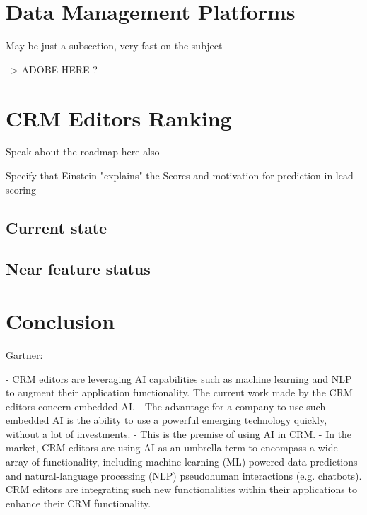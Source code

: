 \section{Data Management Platforms}
May be just a subsection, very fast on the subject

--> ADOBE HERE ?


\section{CRM Editors Ranking}
Speak about the roadmap here also

Specify that Einstein "explains" the Scores and motivation for prediction in lead scoring

\subsection{Current state}


\subsection{Near feature status}


\section{Conclusion}

Gartner:

    - CRM editors are leveraging AI capabilities such as machine learning and NLP to augment their application functionality. The current work made by the CRM editors concern embedded AI.
    - The advantage for a company to use such embedded AI is the ability to use a powerful emerging technology quickly, without a lot of investments. 
    - This is the premise of using AI in CRM.
    - In the market, CRM editors are using AI as an umbrella term to encompass a wide array of functionality, including machine learning (ML) powered data predictions and natural-language processing (NLP) pseudohuman interactions (e.g. chatbots).  CRM editors are integrating such new functionalities within their applications to enhance their CRM functionality.


